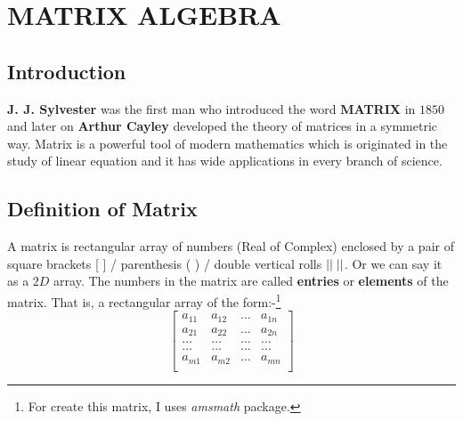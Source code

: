 \documentclass[11 pt]{book}
\begin{document}
	\section*{MATRIX ALGEBRA}
		\subsection*{Introduction}
			\textbf{J. J. Sylvester} was the first man who introduced the word \textbf{MATRIX} in $1850$ and later on \textbf{Arthur Cayley} developed the theory of matrices in a symmetric way. Matrix is a powerful tool of modern mathematics which is originated in the study of linear equation and it has wide applications in every branch of science.
		\subsection*{Definition of Matrix}
			A matrix is rectangular array of numbers (Real of Complex) enclosed by a pair of square brackets [ ] / parenthesis ( ) / double vertical rolls $||\hspace{1mm}||$. Or we can say it as a $2D$ array. The numbers in the matrix are called \textbf{entries} or \textbf{elements} of the matrix. That is, a rectangular array of the form:-\footnote{For create this matrix, I uses \textit{amsmath} package.}
			$$
			\begin{bmatrix}
				a_{11} & a_{12} & \dots & a_{1n}\\
				a_{21} & a_{22} & \dots & a_{2n}\\
				\dots & \dots & \dots & \dots\\
				\dots & \dots & \dots & \dots\\
				a_{m1} & a_{m2} & \dots & a_{mn}\\
			\end{bmatrix}
			$$
\end{document}
